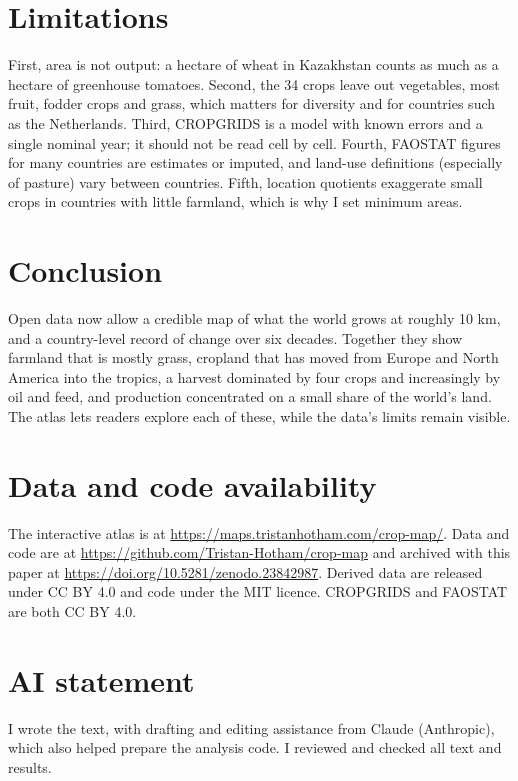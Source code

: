 \documentclass[11pt,a4paper]{article}
\begin{document}
\section{Limitations}
First, area is not output: a hectare of wheat in Kazakhstan counts as much as a hectare of greenhouse tomatoes. Second, the 34 crops leave out vegetables, most fruit, fodder crops and grass, which matters for diversity and for countries such as the Netherlands. Third, CROPGRIDS is a model with known errors and a single nominal year; it should not be read cell by cell. Fourth, FAOSTAT figures for many countries are estimates or imputed, and land-use definitions (especially of pasture) vary between countries. Fifth, location quotients exaggerate small crops in countries with little farmland, which is why I set minimum areas.

\section{Conclusion}
Open data now allow a credible map of what the world grows at roughly 10 km, and a country-level record of change over six decades. Together they show farmland that is mostly grass, cropland that has moved from Europe and North America into the tropics, a harvest dominated by four crops and increasingly by oil and feed, and production concentrated on a small share of the world's land. The atlas lets readers explore each of these, while the data's limits remain visible.

\section*{Data and code availability}
The interactive atlas is at \url{https://maps.tristanhotham.com/crop-map/}. Data and code are at \url{https://github.com/Tristan-Hotham/crop-map} and archived with this paper at \url{https://doi.org/10.5281/zenodo.23842987}. Derived data are released under CC BY 4.0 and code under the MIT licence. CROPGRIDS and FAOSTAT are both CC BY 4.0.

\section*{AI statement}
I wrote the text, with drafting and editing assistance from Claude (Anthropic), which also helped prepare the analysis code. I reviewed and checked all text and results.
\end{document}

